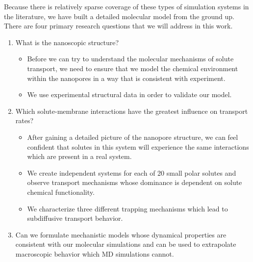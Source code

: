   Because there is relatively sparse coverage of these types of simulation systems in 
  the literature, we have built a detailed molecular model from the ground up. There 
  are four primary research questions that we will address in this work.
  \begin{enumerate}
    \item What is the nanoscopic structure?
    	\begin{itemize}
    	  \item Before we can try to understand the molecular mechanisms of solute
    	  transport, we need to ensure that we model the chemical environment
    	  within the nanopores in a way that is consistent with experiment.
    	  \item We use experimental structural data in order to validate our model.
    	\end{itemize}
    \item Which solute-membrane interactions have the greatest influence on transport rates?
    	\begin{itemize}
    	  \item After gaining a detailed picture of the nanopore structure, we can 
    	  feel confident that solutes in this system will experience the same 
    	  interactions which are present in a real system.
    	  \item We create independent systems for each of 20 small polar solutes 
    	  and observe transport mechanisms whose dominance is dependent on
    	  solute chemical functionality.
    	  \item We characterize three different trapping mechanisms which lead
    	  to subdiffusive transport behavior.
    	\end{itemize}
    \item Can we formulate mechanistic models whose dynamical properties are consistent with our
    molecular simulations and can be used to extrapolate macroscopic behavior which MD simulations cannot.

\end{enumerate}
